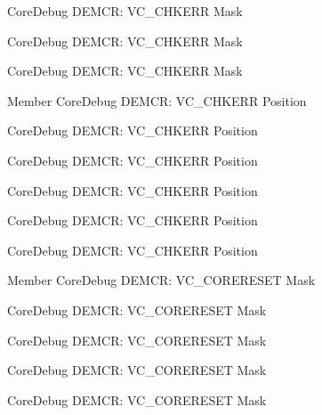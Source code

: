 \begin{DoxyRefList}
\label{deprecated__deprecated000515}%
%
Core\+Debug DEMCR\+: VC\+\_\+\+CHKERR Mask 

\label{deprecated__deprecated000426}%
%
Core\+Debug DEMCR\+: VC\+\_\+\+CHKERR Mask 

\label{deprecated__deprecated000064}%
%
Core\+Debug DEMCR\+: VC\+\_\+\+CHKERR Mask  
\item[Member \doxylink{group__CMSIS__CoreDebug_ga10fc7c53bca904c128bc8e1a03072d50}{Core\+Debug\+\_\+\+DEMCR\+\_\+\+VC\+\_\+\+CHKERR\+\_\+\+Pos} ]\label{deprecated__deprecated000063}%
%
Core\+Debug DEMCR\+: VC\+\_\+\+CHKERR Position 

\label{deprecated__deprecated000514}%
%
Core\+Debug DEMCR\+: VC\+\_\+\+CHKERR Position 

\label{deprecated__deprecated000425}%
%
Core\+Debug DEMCR\+: VC\+\_\+\+CHKERR Position 

\label{deprecated__deprecated000207}%
%
Core\+Debug DEMCR\+: VC\+\_\+\+CHKERR Position 

\label{deprecated__deprecated000349}%
%
Core\+Debug DEMCR\+: VC\+\_\+\+CHKERR Position 

\label{deprecated__deprecated000616}%
%
Core\+Debug DEMCR\+: VC\+\_\+\+CHKERR Position  
\item[Member \doxylink{group__CMSIS__CoreDebug_ga906476e53c1e1487c30f3a1181df9e30}{Core\+Debug\+\_\+\+DEMCR\+\_\+\+VC\+\_\+\+CORERESET\+\_\+\+Msk} ]\label{deprecated__deprecated000277}%
%
Core\+Debug DEMCR\+: VC\+\_\+\+CORERESET Mask 

\label{deprecated__deprecated000138}%
%
Core\+Debug DEMCR\+: VC\+\_\+\+CORERESET Mask 

\label{deprecated__deprecated000521}%
%
Core\+Debug DEMCR\+: VC\+\_\+\+CORERESET Mask 

\label{deprecated__deprecated000623}%
%
Core\+Debug DEMCR\+: VC\+\_\+\+CORERESET Mask 

\label{deprecated__deprecated000070}%
%
Core\+Debug DEMCR\+: VC\+\_\+\+CORERESET Mask 


\end{DoxyRefList}
